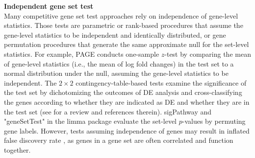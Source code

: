 \documentclass[useAMS,usenatbib, galley]{biom}
\begin{document}
	\textbf{Independent gene set test} \\
	Many competitive gene set test approaches rely on independence of gene-level statistics. Those tests are parametric or rank-based procedures that assume the gene-level statistics to be independent and identically distributed, or gene permutation procedures that generate the same approximate null for the set-level statistics. For example, PAGE  \citep{kim2005page} conducts one-sample $z$-test by comparing the mean of gene-level statistics (i.e., the mean of log fold changes) in the test set to a normal distribution under the null, assuming the  gene-level statistics to be independent. The $2\times 2$ contingency-table-based tests examine the significance of the test set by dichotomizing the outcomes of DE analysis and cross-classifying the genes according to whether they are indicated as DE and whether they are in the test set (see \cite{huang2009bioinformatics} for a review and references therein). sigPathway \citep{tian2005discovering} and "geneSetTest" in the limma package \citep{Smyth2004moderated} evaluate the set-level $p$-values by permuting gene labels. However, tests assuming independence of genes may result in inflated false discovery rate \citep{efron2007testing,goeman2007analyzing, gatti2010heading,wu2012camera,yaari2013quantitative},
	as genes in a gene set are often correlated and function together.
	
\end{document}
